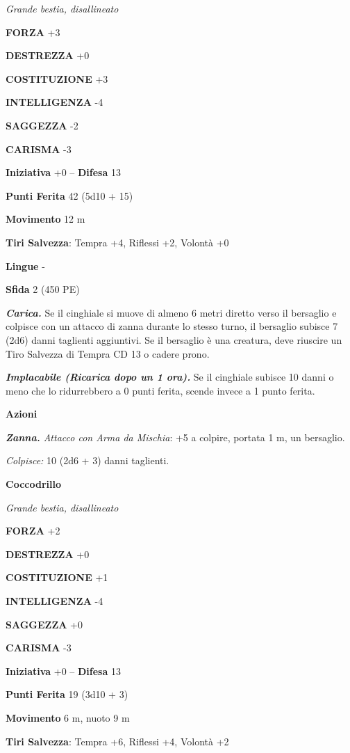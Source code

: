 \begin{multicols}{2}
\emph{Grande bestia, disallineato}

\textbf{FORZA} +3

\textbf{DESTREZZA} +0

\textbf{COSTITUZIONE} +3

\textbf{INTELLIGENZA} -4

\textbf{SAGGEZZA} -2

\textbf{CARISMA} -3

\textbf{Iniziativa} +0 -- \textbf{Difesa} 13

\textbf{Punti Ferita} 42 (5d10 + 15)

\textbf{Movimento} 12 m

\textbf{Tiri Salvezza}: Tempra +4, Riflessi +2, Volontà +0

\textbf{Lingue} -

\textbf{Sfida} 2 (450 PE)

\emph{\textbf{Carica.}} Se il cinghiale si muove di almeno 6 metri diretto verso il bersaglio e colpisce con un attacco di zanna durante lo stesso turno, il bersaglio subisce 7 (2d6) danni taglienti aggiuntivi. Se il bersaglio è una creatura, deve riuscire un Tiro Salvezza di Tempra CD 13 o cadere prono.

\emph{\textbf{Implacabile (Ricarica dopo un 1 ora).}} Se il cinghiale subisce 10 danni o meno che lo ridurrebbero a 0 punti ferita, scende invece a 1 punto ferita.

\textbf{Azioni}

\emph{\textbf{Zanna.} Attacco con Arma da Mischia}: +5 a colpire, portata 1 m, un bersaglio.

\emph{Colpisce:} 10 (2d6 + 3) danni taglienti.

\medskip\textbf{Coccodrillo}

\emph{Grande bestia, disallineato}

\textbf{FORZA} +2

\textbf{DESTREZZA} +0

\textbf{COSTITUZIONE} +1

\textbf{INTELLIGENZA} -4

\textbf{SAGGEZZA} +0

\textbf{CARISMA} -3

\textbf{Iniziativa} +0 -- \textbf{Difesa} 13

\textbf{Punti Ferita} 19 (3d10 + 3)

\textbf{Movimento} 6 m, nuoto 9 m

\textbf{Tiri Salvezza}: Tempra +6, Riflessi +4, Volontà +2 


\end{multicols}
